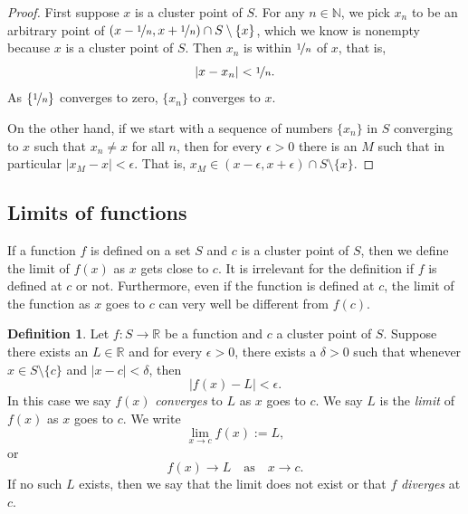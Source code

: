 \documentclass[12pt]{book}
\newcommand{\abs}[1]{\left\lvert {#1} \right\rvert}
\newcommand{\R}{{\mathbb{R}}}
\newcommand{\N}{{\mathbb{N}}}
\newcommand{\myindex}[1]{#1\index{#1}}
\theoremstyle{plain}
\theoremstyle{remark}
\theoremstyle{definition}
\newtheorem{defn}[thm]{Definition}
\theoremstyle{exercise}
\theoremstyle{example}
\begin{document}
\begin{proof}
First suppose $x$ is a cluster point of $S$.
For any $n \in \N$, we pick $x_n$ to be an arbitrary point of
$(x-\nicefrac{1}{n},x+\nicefrac{1}{n}) \cap S \setminus \{x\}$, which
we know is nonempty because $x$ is a cluster point of $S$.
Then
$x_n$ is within $\nicefrac{1}{n}$ of $x$, that is,
\begin{equation*}
\abs{x-x_n} < \nicefrac{1}{n} .
\end{equation*}
As $\{ \nicefrac{1}{n} \}$ converges to zero, $\{ x_n \}$ converges to $x$.

On the other hand, if we start with a sequence of numbers $\{ x_n \}$ in $S$
converging to $x$ such that $x_n \not= x$ for all $n$, then for every
$\epsilon > 0$ there is an $M$ such that in particular $\abs{x_M - x} <
\epsilon$.  That is, $x_M \in (x-\epsilon,x+\epsilon) \cap S \setminus \{x\}$.
\end{proof}

\subsection{Limits of functions}

If a function $f$ is defined on a set $S$ and $c$ is a cluster point of $S$,
then we define the limit of $f(x)$ as $x$ gets close to $c$.  
It is irrelevant for the definition if $f$ is defined at $c$ or not.
Furthermore, even if the function is defined at $c$, the limit of the
function as $x$ goes to $c$ can very well be different
from $f(c)$.

\begin{defn}
%
Let $f \colon S \to \R$ be a function and $c$ a cluster point of $S$.
Suppose there exists an $L \in \R$ and for every $\epsilon > 0$,
there exists a $\delta > 0$ such that whenever $x \in S \setminus \{ c \}$
and $\abs{x - c} < \delta$, then
\begin{equation*}
\abs{f(x) - L} < \epsilon .
\end{equation*}
In this case we say $f(x)$ \emph{\myindex{converges}} to $L$ as $x$ goes
to $c$.  We say $L$ is the \emph{\myindex{limit}} of $f(x)$ as $x$
goes to $c$.  We write
\begin{equation*}
\lim_{x \to c} f(x) := L ,
\end{equation*}
or 
\begin{equation*}
f(x) \to L \quad\text{as}\quad x \to c .
\end{equation*}
If no such $L$ exists, then we say that the limit does not exist or
that $f$ \emph{\myindex{diverges}} at $c$.
\end{defn}
\end{document}
